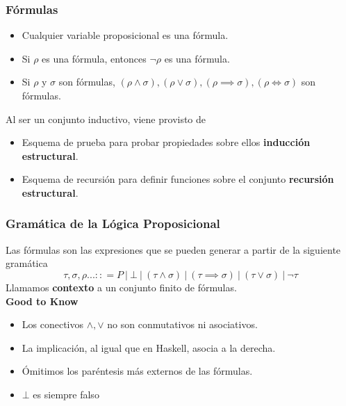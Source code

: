\documentclass[10pt,a4paper]{article}
\begin{document}
\subsubsection*{Fórmulas}
\begin{itemize}
    \item Cualquier variable proposicional es una fórmula.
    \item Si $\rho$ es una fórmula, entonces $\neg \rho$ es una fórmula.
    \item Si $\rho$ y $\sigma$ son fórmulas, $(\rho \land \sigma), (\rho \lor \sigma), (\rho \implies \sigma), (\rho \iff \sigma) $ son fórmulas.
\end{itemize}
Al ser un conjunto inductivo, viene provisto de 
\begin{itemize}
    \item Esquema de prueba para probar propiedades sobre ellos \textbf{inducción estructural}.
    \item Esquema de recursión para definir funciones sobre el conjunto \textbf{recursión estructural}.
\end{itemize}
\subsubsection*{Gramática de la Lógica Proposicional}
Las fórmulas son las expresiones que se pueden generar a partir de la siguiente gramática 
\[\tau, \sigma, \rho ... :: = P \ | \ \bot \ | \ (\tau \land \sigma) \ | \ (\tau \implies \sigma) \ | \ (\tau \lor \sigma) \ | \ \neg \tau\] 
Llamamos \textbf{contexto} a un conjunto finito de fórmulas.  \\
\textbf{Good to Know}
\begin{itemize}
    \item Los conectivos $\land, \lor$ no son conmutativos ni asociativos.
    \item La implicación, al igual que en Haskell, asocia a la derecha.
    \item Ómitimos los paréntesis más externos de las fórmulas.
    \item $\bot$ es siempre falso
\end{itemize}
\end{document}
